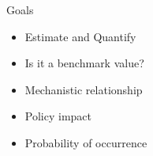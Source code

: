 \documentclass[11pt]{beamer}
\begin{document}
\begin{frame}{
	\begin{minipage}[t]{0.55\textwidth}
		Goals
	\end{minipage}
	\hfill
	\begin{minipage}[t]{0.35\textwidth}
		\flushright
	\end{minipage}
}{}
\begin{itemize}
	\item Estimate and Quantify
	\item Is it a benchmark value?
	\item Mechanistic relationship
	\item Policy impact
	\item Probability of occurrence
\end{itemize}
\end{frame}
\end{document}
